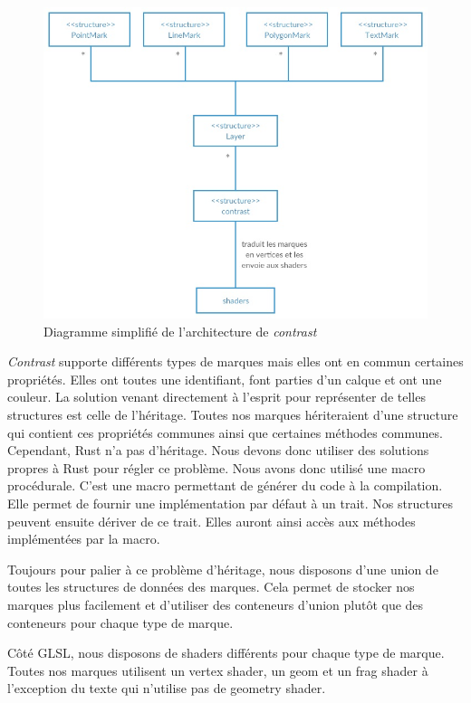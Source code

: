 \documentclass[12pt]{article}
\begin{document}
\begin{figure}[htp]
  \centering
  \includegraphics[scale=1.0]{images/architecture}
  \caption{Diagramme simplifié de l'architecture de \textit{contrast} }
  \label{fig:arch}
\end{figure}

\textit{Contrast} supporte différents types de marques mais elles ont en commun certaines propriétés.
Elles ont toutes une identifiant, font parties d'un calque et ont une couleur.
La solution venant directement à l'esprit pour représenter de telles structures est celle de l'héritage.
Toutes nos marques hériteraient d'une structure qui contient ces propriétés communes ainsi que certaines
méthodes communes.
Cependant, Rust n'a pas d'héritage. Nous devons donc utiliser des solutions propres à Rust pour régler
ce problème.
Nous avons donc utilisé une macro procédurale. C'est une macro permettant de générer du code à la
compilation. Elle permet de fournir une implémentation par défaut à un trait. Nos structures peuvent
ensuite dériver de ce trait. Elles auront ainsi accès aux méthodes implémentées par la macro.

Toujours pour palier à ce problème d'héritage, nous disposons d'une union de toutes les structures
de données des marques. Cela permet de stocker nos marques plus facilement et d'utiliser des conteneurs d'union plutôt que des conteneurs pour chaque type de marque.

Côté GLSL, nous disposons de shaders différents pour chaque type de marque. Toutes nos marques utilisent un vertex shader, un \gls{geom} et un \gls{frag} shader à l'exception du texte qui n'utilise pas de geometry shader.
\end{document}
